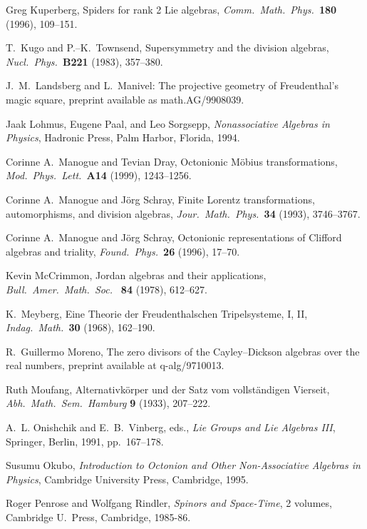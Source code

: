 \documentclass[12pt]{article}
\begin{document}
\begin{thebibliography}{10}
 Greg Kuperberg, Spiders for rank 2 Lie algebras,
{\sl Comm.\ Math.\ Phys.\ }{\bf 180} (1996), 109--151.

 T.\ Kugo and P.--K.\ Townsend, Supersymmetry and the 
division algebras, {\sl Nucl.\ Phys.\ }{\bf B221} (1983), 357--380. 
 
 J.\ M.\ Landsberg and L.\ Manivel: The projective geometry of   
Freudenthal's magic square, preprint available as math.AG/9908039.   
 
 Jaak Lohmus, Eugene Paal, and Leo Sorgsepp,    
{\sl Nonassociative Algebras in Physics}, Hadronic Press, Palm   
Harbor, Florida, 1994.   

 Corinne A.\ Manogue and Tevian Dray, Octonionic    
M\"obius transformations, {\sl Mod.\ Phys.\ Lett.\ }{\bf A14} (1999), 
1243--1256. 

 Corinne A.\ Manogue and J\"org Schray, Finite Lorentz   
transformations, automorphisms, and division algebras, {\sl Jour.\   
Math.\ Phys.\ }{\bf 34} (1993), 3746--3767.   
 
 Corinne A.\ Manogue and J\"org Schray, Octonionic    
representations of Clifford algebras and triality, {\sl Found.\    
Phys.\ }{\bf 26} (1996), 17--70.    
 
 Kevin McCrimmon, Jordan algebras and their applications,   
{\sl Bull.\ Amer.\ Math.\ Soc.\ } {\bf 84} (1978), 612--627.     

\bibitem{Meyberg} K.\ Meyberg, Eine Theorie der Freudenthalschen 
Tripelsysteme, I, II, {\sl Indag.\ Math.\ }{\bf 30} (1968),
162--190.
 
 R.\ Guillermo Moreno, The zero divisors of the    
Cayley--Dickson algebras over the real numbers, preprint available    
at q-alg/9710013.   
  
 Ruth Moufang, Alternativk\"orper und der Satz vom  
vollst\"andigen Vierseit, {\sl Abh.\ Math.\ Sem.\ Hamburg} {\bf 9} 
(1933), 207--222. 
  
 A.\ L. Onishchik and E.\ B.\ Vinberg, eds., {\sl Lie Groups 
and Lie Algebras III}, Springer, Berlin, 1991, pp.\ 167--178.   
   
\bibitem{Okubo} Susumu Okubo, {\sl Introduction to Octonion and Other    
Non-Associative Algebras in Physics}, Cambridge University Press,   
Cambridge, 1995.   
 
 Roger Penrose and Wolfgang Rindler, {\sl Spinors and  
Space-Time}, 2 volumes, Cambridge U.\ Press, Cambridge, 1985-86. 
  

\end{thebibliography}
\end{document}
